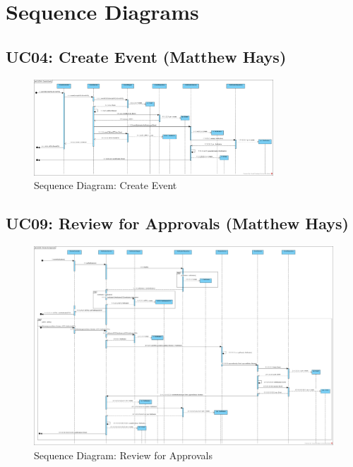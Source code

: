\documentclass{article}
\begin{document}
\section{Sequence Diagrams}
\subsection{UC04: Create Event (Matthew Hays)}
\begin{figure}[H]
    \centering
    \includegraphics[width=0.8\textwidth]{images/SD-UC04-CreateEvent.png}
    \centering
    \caption{Sequence Diagram: Create Event}
\end{figure}
\subsection{UC09: Review for Approvals (Matthew Hays)}
\begin{figure}[H]
    \centering
    \includegraphics[width=.8\textwidth]{images/SD-UC09-ReviewForApproval.png}
    \centering
    \caption{Sequence Diagram: Review for Approvals}
\end{figure}
\end{document}
